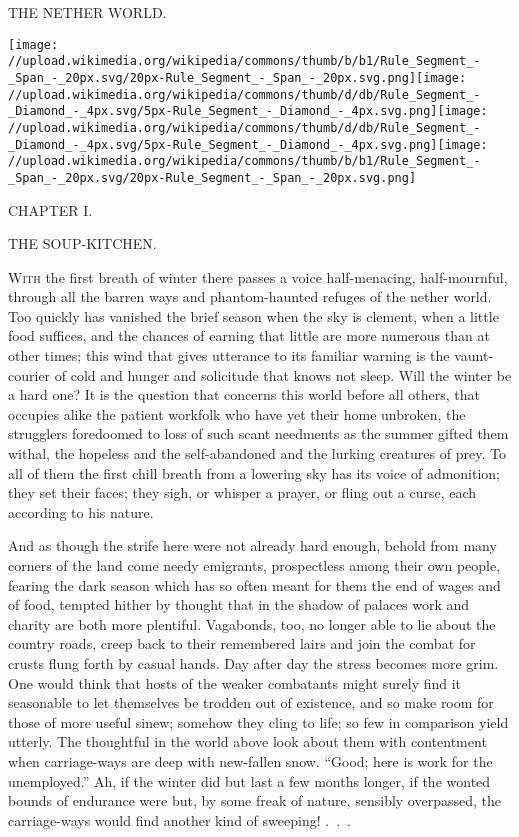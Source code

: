{}

{THE NETHER WORLD.}

\texttt{[image: //upload.wikimedia.org/wikipedia/commons/thumb/b/b1/Rule\_Segment\_-\_Span\_-\_20px.svg/20px-Rule\_Segment\_-\_Span\_-\_20px.svg.png]}\texttt{[image: //upload.wikimedia.org/wikipedia/commons/thumb/d/db/Rule\_Segment\_-\_Diamond\_-\_4px.svg/5px-Rule\_Segment\_-\_Diamond\_-\_4px.svg.png]}\texttt{[image: //upload.wikimedia.org/wikipedia/commons/thumb/d/db/Rule\_Segment\_-\_Diamond\_-\_4px.svg/5px-Rule\_Segment\_-\_Diamond\_-\_4px.svg.png]}\texttt{[image: //upload.wikimedia.org/wikipedia/commons/thumb/b/b1/Rule\_Segment\_-\_Span\_-\_20px.svg/20px-Rule\_Segment\_-\_Span\_-\_20px.svg.png]}

{CHAPTER I.}

THE SOUP-KITCHEN.

\textsc{With} the first breath of winter there passes a voice
half-menacing, half-mournful, through all the barren ways and
phantom-haunted refuges of the nether world. Too quickly has vanished
the brief season when the sky is clement, when a little food suffices,
and the chances of earning that little are more numerous than at other
times; this wind that gives utterance to its familiar warning is the
vaunt-courier of cold and hunger and solicitude that knows not sleep.
Will the winter be a hard one? It is the question that concerns this
world before all others, that occupies alike the patient workfolk who
have yet their home unbroken, the strugglers foredoomed to loss of such
scant needments as the summer gifted {}them withal, the hopeless and the
self-abandoned and the lurking creatures of prey. To all of them the
first chill breath from a lowering sky has its voice of admonition; they
set their faces; they sigh, or whisper a prayer, or fling out a curse,
each according to his nature.

And as though the strife here were not already hard enough, behold from
many corners of the land come needy emigrants, prospectless among their
own people, fearing the dark season which has so often meant for them
the end of wages and of food, tempted hither by thought that in the
shadow of palaces work and charity are both more plentiful. Vagabonds,
too, no longer able to lie about the country roads, creep back to their
remembered lairs and join the combat for crusts flung forth by casual
hands. Day after day the stress becomes more grim. One would think that
hosts of the weaker combatants might surely find it seasonable to let
themselves be trodden out of existence, and so make room for those of
more useful sinew; somehow they cling to life; so few in comparison
yield utterly. The thoughtful in the world above look about them with
contentment when carriage-ways are deep {}with new-fallen snow. ``Good;
here is work for the unemployed.'' Ah, if the winter did but last a few
months longer, if the wonted bounds of endurance were but, by some freak
of nature, sensibly overpassed, the carriage-ways would find another
kind of {sweeping! {.~.~.}}

